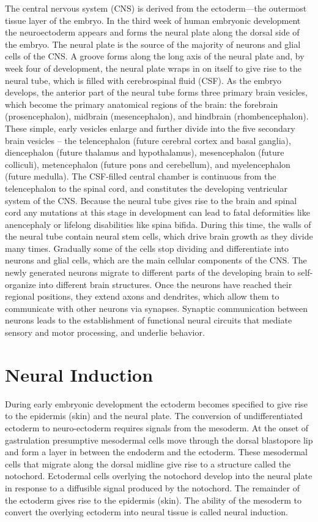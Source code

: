 \documentclass[]{book}
\begin{document}
The central nervous system (CNS) is derived from the ectoderm---the outermost tissue layer of the embryo. In the third week of human embryonic development the neuroectoderm appears and forms the neural plate along the dorsal side of the embryo. The neural plate is the source of the majority of neurons and glial cells of the CNS. A groove forms along the long axis of the neural plate and, by week four of development, the neural plate wraps in on itself to give rise to the neural tube, which is filled with cerebrospinal fluid (CSF). As the embryo develops, the anterior part of the neural tube forms three primary brain vesicles, which become the primary anatomical regions of the brain: the forebrain (prosencephalon), midbrain (mesencephalon), and hindbrain (rhombencephalon). These simple, early vesicles enlarge and further divide into the five secondary brain vesicles -- the telencephalon (future cerebral cortex and basal ganglia), diencephalon (future thalamus and hypothalamus), mesencephalon (future colliculi), metencephalon (future pons and cerebellum), and myelencephalon (future medulla). The CSF-filled central chamber is continuous from the telencephalon to the spinal cord, and constitutes the developing ventricular system of the CNS. Because the neural tube gives rise to the brain and spinal cord any mutations at this stage in development can lead to fatal deformities like anencephaly or lifelong disabilities like spina bifida. During this time, the walls of the neural tube contain neural stem cells, which drive brain growth as they divide many times. Gradually some of the cells stop dividing and differentiate into neurons and glial cells, which are the main cellular components of the CNS. The newly generated neurons migrate to different parts of the developing brain to self-organize into different brain structures. Once the neurons have reached their regional positions, they extend axons and dendrites, which allow them to communicate with other neurons via synapses. Synaptic communication between neurons leads to the establishment of functional neural circuits that mediate sensory and motor processing, and underlie behavior.

\hypertarget{neural-induction}{%
\section{Neural Induction}\label{neural-induction}}

During early embryonic development the ectoderm becomes specified to give rise to the epidermis (skin) and the neural plate. The conversion of undifferentiated ectoderm to neuro-ectoderm requires signals from the mesoderm. At the onset of gastrulation presumptive mesodermal cells move through the dorsal blastopore lip and form a layer in between the endoderm and the ectoderm. These mesodermal cells that migrate along the dorsal midline give rise to a structure called the notochord. Ectodermal cells overlying the notochord develop into the neural plate in response to a diffusible signal produced by the notochord. The remainder of the ectoderm gives rise to the epidermis (skin). The ability of the mesoderm to convert the overlying ectoderm into neural tissue is called neural induction.
\end{document}
